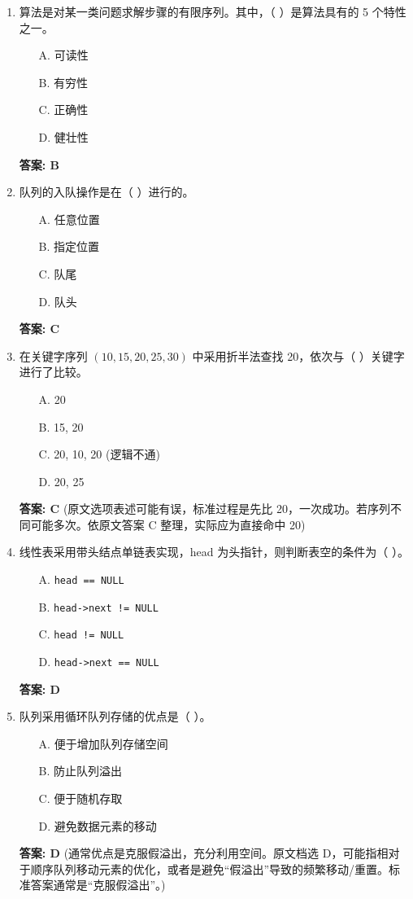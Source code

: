 \documentclass[12pt, a4paper]{article}
\begin{document}
\begin{enumerate}
    \item 算法是对某一类问题求解步骤的有限序列。其中，（ ）是算法具有的 5 个特性之一。
    \begin{enumerate}
        \item[A.] 可读性
        \item[B.] 有穷性
        \item[C.] 正确性
        \item[D.] 健壮性
    \end{enumerate}
    \textbf{答案: B}

    \item 队列的入队操作是在（ ）进行的。
    \begin{enumerate}
        \item[A.] 任意位置
        \item[B.] 指定位置
        \item[C.] 队尾
        \item[D.] 队头
    \end{enumerate}
    \textbf{答案: C}

    \item 在关键字序列 $(10, 15, 20, 25, 30)$ 中采用折半法查找 20，依次与（ ）关键字进行了比较。
    \begin{enumerate}
        \item[A.] 20
        \item[B.] 15, 20
        \item[C.] 20, 10, 20 (逻辑不通)
        \item[D.] 20, 25
    \end{enumerate}
    \textbf{答案: C} (原文选项表述可能有误，标准过程是先比 20，一次成功。若序列不同可能多次。依原文答案 C 整理，实际应为直接命中 20)

    \item 线性表采用带头结点单链表实现，head 为头指针，则判断表空的条件为（ ）。
    \begin{enumerate}
        \item[A.] \texttt{head == NULL}
        \item[B.] \texttt{head->next != NULL}
        \item[C.] \texttt{head != NULL}
        \item[D.] \texttt{head->next == NULL}
    \end{enumerate}
    \textbf{答案: D}

    \item 队列采用循环队列存储的优点是（ ）。
    \begin{enumerate}
        \item[A.] 便于增加队列存储空间
        \item[B.] 防止队列溢出
        \item[C.] 便于随机存取
        \item[D.] 避免数据元素的移动
    \end{enumerate}
    \textbf{答案: D} (通常优点是克服假溢出，充分利用空间。原文档选 D，可能指相对于顺序队列移动元素的优化，或者是避免“假溢出”导致的频繁移动/重置。标准答案通常是“克服假溢出”。)


\end{enumerate}
\end{document}
